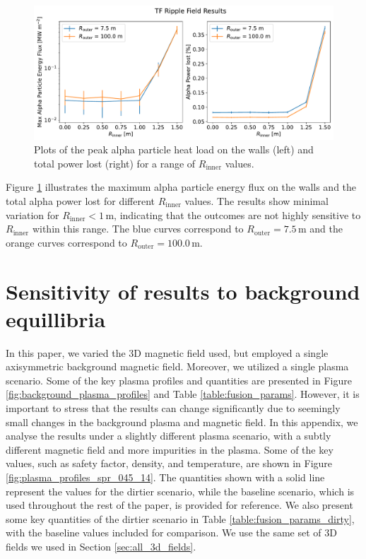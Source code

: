 \documentclass[10pt, a4paper, twoside]{article}
\begin{document}
\begin{figure}[!ht]
    \centering
    \includegraphics[width=0.99\linewidth]{Figures/max_and_total_energy_flux_vs_rcoil_inner.pdf}
    \caption{Plots of the peak alpha particle heat load on the walls (left) and total power lost (right) for a range of \( R_\text{inner} \) values.}
    \label{fig:max_and_total_energy_flux_vs_rcoil_inner}
\end{figure}

Figure \ref{fig:max_and_total_energy_flux_vs_rcoil_inner} illustrates the maximum alpha particle energy flux on the walls and the total alpha power lost for different \( R_\text{inner} \) values. The results show minimal variation for \( R_\text{inner} < 1\,\text{m} \), indicating that the outcomes are not highly sensitive to \( R_\text{inner} \) within this range. The blue curves correspond to \( R_\text{outer} = 7.5\,\text{m} \) and the orange curves correspond to \( R_\text{outer} = 100.0\,\text{m} \).


\section{Sensitivity of results to background equillibria}
\label{appendix:sensitivity_of_results_to_background_equillibria}

In this paper, we varied the 3D magnetic field used, but employed a single axisymmetric background magnetic field. Moreover, we utilized a single plasma scenario. Some of the key plasma profiles and quantities are presented in Figure \ref{fig:background_plasma_profiles} and Table \ref{table:fusion_params}. However, it is important to stress that the results can change significantly due to seemingly small changes in the background plasma and magnetic field. In this appendix, we analyse the results under a slightly different plasma scenario, with a subtly different magnetic field and more impurities in the plasma. Some of the key values, such as safety factor, density, and temperature, are shown in Figure \ref{fig:plasma_profiles_spr_045_14}. The quantities shown with a solid line represent the values for the dirtier scenario, while the baseline scenario, which is used throughout the rest of the paper, is provided for reference. We also present some key quantities of the dirtier scenario in Table \ref{table:fusion_params_dirty}, with the baseline values included for comparison. We use the same set of 3D fields we used in Section \ref{sec:all_3d_fields}.
\end{document}

